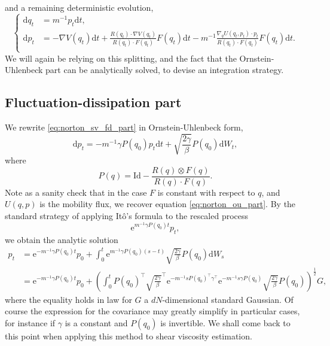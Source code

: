 \documentclass[a4paper,10pt,twoside,leqno]{report}
\newcommand{\Id}{\mathrm{Id}}
\newcommand{\dif}{\mathrm{d}}
\newcommand{\1}{\mathbbm{1}}
\newcommand{\e}{\mathrm{e}}
\begin{document}
    and a remaining deterministic evolution,
    \begin{equation}
        \label{eq:norton_sv_constrained_hamiltonian}
        \left\{
            \begin{aligned}
                \dif q_t &= m^{-1}p_t\dif t,\\
                \dif p_t &= -\nabla V(q_t)\dif t +\frac{R(q_t)\cdot \nabla V(q_t)}{R(q_t)\cdot F(q_t)}F(q_t)\dif t-m^{-1}\frac{\nabla_q U(q_t,p_t)\cdot p_t}{R(q_t)\cdot F(q_t)}F(q_t)\dif t.\\
            \end{aligned}
        \right.
    \end{equation}
    We will again be relying on this splitting, and the fact that the Ornstein-Uhlenbeck part can be analytically solved, to devise an integration strategy.
    \subsection{Fluctuation-dissipation part}
    We rewrite \eqref{eq:norton_sv_fd_part} in Ornstein-Uhlenbeck form,
    \begin{equation}
        \label{eq:norton_sv_fd_part_ito_form}
        \dif p_t=-m^{-1}\gamma P(q_0)p_t\dif t+\sqrt{\frac{2\gamma}\beta}P(q_0)\dif W_t,
    \end{equation}
    where 
    \begin{equation}
        \label{eq:norton_sv_M_definition}
        P(q)=\Id-\frac{R(q)\otimes F(q)}{R(q)\cdot F(q)}.
    \end{equation}
    Note as a sanity check that in the case $F$ is constant with respect to $q$, and $U(q,p)$ is the mobility flux, we recover equation \eqref{eq:norton_ou_part}.
    By the standard strategy of applying Itô's formula to the rescaled process
    \[\e^{m^{-1}\gamma P(q_0)t}p_t,\]
    we obtain the analytic solution 
    \begin{equation}
        \label{eq:norton_sv_fd_part_solved}
        \begin{aligned}
            p_t&=\e^{-m^{-1}\gamma P(q_0)t}p_0+\int_0^t \e^{m^{-1}\gamma P(q_0)(s-t)}\sqrt{\frac{2\gamma}{\beta}}P(q_0)\dif W_s\\
            &=\e^{-m^{-1}\gamma P(q_0)t}p_0+\left(\int_0^tP(q_0)^\intercal\sqrt{\frac{2\gamma}{\beta}}^\intercal\e^{-m^{-1}sP(q_0)^\intercal\gamma^\intercal}\e^{-m^{-1}s\gamma P(q_0)}\sqrt{\frac{2\gamma}{\beta}}P(q_0)\right)^{\frac12}G,
        \end{aligned}
    \end{equation}
    where the equality holds in law for $G$ a $dN$-dimensional standard Gaussian. Of course the expression for the covariance may greatly simplify in particular cases, for instance if $\gamma$ is a constant and $P(q_0)$ is invertible.
    We shall come back to this point when applying this method to shear viscosity estimation.
\end{document}
